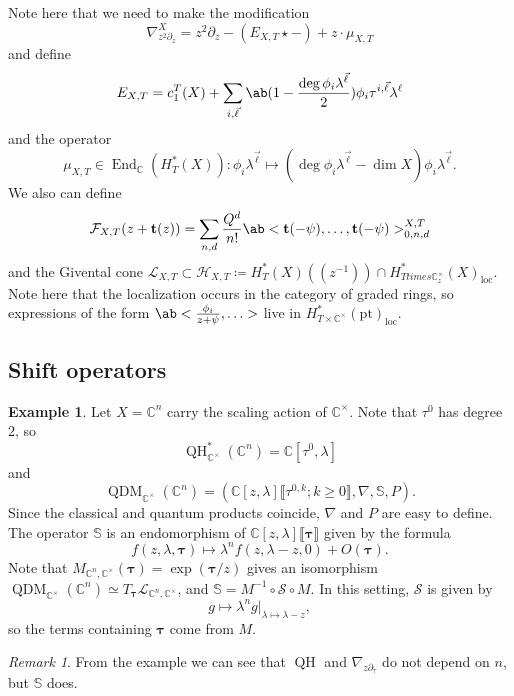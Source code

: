\documentclass{amsart}
\theoremstyle{definition}
\newtheorem{exm}[thm]{Example}
\theoremstyle{remark}
\newtheorem{rmk}[thm]{Remark}
\theoremstyle{plain}
\theoremstyle{definition}
\theoremstyle{remark}
\newcommand{\C}{\mathbb{C}}
\newcommand{\bS}{\mathbb{S}}
\renewcommand{\mc}[1]{\mathcal{#1}}
\newcommand{\mbf}[1]{\mathbf{#1}}
\newcommand{\bt}{\mbf{t}}
\newcommand{\btau}{\symbf{\tau}}
\newcommand{\mr}[1]{\mathrm{#1}}
\newcommand{\1}{\mathbf{1}}
\newcommand{\2}{\mathbf{2}}
\newcommand{\3}{\mathbf{3}}
\newcommand{\ps}[1]{\lBrack #1 \rBrack}
\newcommand{\ls}[1]{(\!( #1 )\!)}
\DeclareMathOperator{\End}{End}
\DeclareMathOperator{\QH}{QH}
\DeclareMathOperator{\QDM}{QDM}
\begin{document}
Note here that we need to make the modification
\[
    \nabla_{z^2 \partial_z}^X = z^2 \partial_z - (E_{X, T} \star -) + z \cdot \mu_{X, T}
\]
and define
\[ E_{X, T} = c_1^T(X) + \sum_{i, \vec{\ell}} \ab(1 - \frac{\deg \phi_i \lambda^{\vec{\ell}}}{2})\phi_i \tau^{i, \vec{\ell}} \lambda^{\ell} \]
and the operator
\[ \mu_{X, T} \in \End_{\C}(H_T^*(X)) \colon \phi_i \lambda^{\vec{\ell}} \mapsto (\deg \phi_i \lambda^{\vec{\ell}} - \dim X) \phi_i \lambda^{\vec{\ell}}. \]
We also can define
\[ \mc{F}_{X, T}(z + \bt(z)) = \sum_{n, d} \frac{Q^d}{n!} \ab<\bt(-\psi), \ldots, \bt(-\psi)>_{0,n,d}^{X,T} \]
and the Givental cone \(\mc{L}_{X,T} \subset \mc{H}_{X, T} \coloneqq H_T^*(X)\ls{z^{-1}} \cap H_{T times \C_z^{\times}}^*(X)_{\mr{loc}}\). Note here that the localization occurs in the category of graded rings, so expressions of the form \(\ab<\frac{\phi_i}{z+\psi}, \ldots>\) live in \(H_{T \times \C^{\times}}^*(\mr{pt})_{\mr{loc}}\).

\subsection{Shift operators}%
\label{sub:Shift operators}

\begin{exm}
    Let \(X = \C^n\) carry the scaling action of \(\C^{\times}\). Note that \(\tau^0\) has degree \(2\), so
    \[ \QH_{\C^{\times}}^*(\C^n) = \C[\tau^0, \lambda] \]
    and
    \[ \QDM_{\C^{\times}}(\C^n) = (\C[z, \lambda]\ps{\tau^{0,k}; k \geq 0}, \nabla, \bS, P). \]
    Since the classical and quantum products coincide, \(\nabla\) and \(P\) are easy to define. The operator \(\bS\) is an endomorphism of \(\C[z, \lambda]\ps{\btau}\) given by the formula
    \[ f(z, \lambda, \btau) \mapsto \lambda^n f(z, \lambda - z, 0) + O(\btau). \]
    Note that \(M_{\C^n, \C^{\times}}(\btau) = \exp(\btau/z)\) gives an isomorphism \(\QDM_{\C^{\times}}(\C^n) \simeq T_{\btau} \mc{L}_{\C^n, \C^{\times}}\), and \(\bS = M^{-1} \circ \mc{S} \circ M\). In this setting, \(\mc{S}\) is given by
    \[ g \mapsto \lambda^n g |_{\lambda \mapsto \lambda - z}, \] 
    so the terms containing \(\btau\) come from \(M\).
\end{exm}

\begin{rmk}
    From the example we can see that \(\QH\) and \(\nabla_{z \partial_{\tau}}\) do not depend on \(n\), but \(\bS\) does.
\end{rmk}
\end{document}
